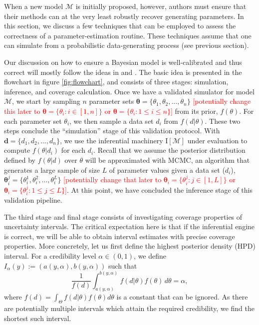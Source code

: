 \documentclass[oneside]{article}
\begin{document}
When a new model $\mathcal{M}$ is initially proposed, however, authors must ensure
that their methods
can at the very least robustly recover generating parameters.
In this section, we discuss a few techniques that can be employed to assess
the correctness of a parameter-estimation routine.
These techniques assume that one can simulate from a probabilistic data-generating
process (see previous section).

\vspace{.25cm}


Our discussion on how to ensure a Bayesian model is well-calibrated
and thus correct will mostly follow the ideas in \citet{Cook2006} and \citet{Talts2018}.
The basic idea is presented in the flowchart in figure \ref{fig:flowchart}, and
consists of three stages: simulation, inference, and coverage calculation.
Once we have a validated simulator for model $\mathcal{M}$, we start by sampling $n$ parameter sets $\boldsymbol{\theta} = \{\theta_1,\theta_2,...,\theta_n\}$ \textcolor{red}{[potentially change this later to $\boldsymbol{\theta} = \{\theta_i: i \in [1, n]\}$ or $\boldsymbol{\theta} = \{\theta_i: 1 \leq i \leq n\}$]} from its prior, $f(\theta)$.
For each parameter set $\theta_i$, we then sample a data set $d_i$ from $f(d |\theta)$.
These two steps conclude the ``simulation'' stage of this validation
protocol.
With $\boldsymbol{d} = \{d_1,d_2,...,d_n\}$, we use the inferential machinery $\text{I}[\mathcal{M}]$ under evaluation to compute $f(\theta|d_i)$ for each $d_i$.
Recall that we assume the posterior distribution defined by $f(\theta|d)$ over $\theta$ will be approximated with MCMC, an algorithm that generates a large sample of size $L$ of parameter values given a data set ($d_i$), $\boldsymbol{\theta}_i^{j}=\{\theta_i^1,\theta_i^2,...,
\theta_i^L\}$ \textcolor{red}{[potentially change that later to
  $\boldsymbol{\theta}_i = \{\theta_i^j: j \in [1, L]\}$ or $\boldsymbol{\theta}_i = \{\theta_i^j: 1 \leq j \leq L\}$]}.
At this point, we have concluded the inference stage of this validation pipeline.

The third stage and final stage consists of investigating coverage properties
of uncertainty intervals.
The critical expectation here is that if the inferential engine is correct, we will be able
to obtain interval estimates with precise coverage properties.
More concretely, let us first define the highest posterior density (HPD) interval.
For a credibility level $\alpha \in (0, 1)$, we define $I_\alpha(y) := (a(y, \alpha), b(y, \alpha))$ such that
\begin{equation*}
  \frac{1}{f(d)} \int_{a(y, \alpha)}^{b(y,\alpha)} f(d | \theta)f(\theta)\, d\theta = \alpha,
\end{equation*}
\noindent where $f(d) = \int_\Theta f(d|\theta)f(\theta)d\theta$ is a constant that can be ignored.
As there are potentially multiple intervals which attain the required credibility, we find the shortest such interval.
\end{document}
